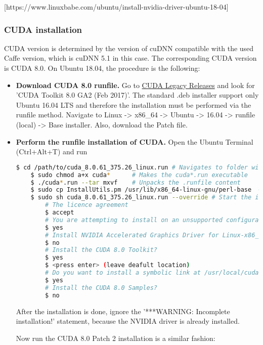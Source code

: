 [https://www.linuxbabe.com/ubuntu/install-nvidia-driver-ubuntu-18-04]

\subsubsection{CUDA installation}

CUDA version is determined by the version of cuDNN compatible with the used Caffe version, which is cuDNN 5.1 in this case. The corresponding CUDA version is CUDA 8.0. On Ubuntu 18.04, the procedure is the following:

\begin{itemize}
	\item \textbf{Download CUDA 8.0 runfile.} Go to \href{https://developer.nvidia.com/cuda-80-ga2-download-archive}{CUDA Legacy Releases} and look for 'CUDA Toolkit 8.0 GA2 (Feb 2017)'. The standard .deb installer support only Ubuntu 16.04 LTS and therefore the installation must be performed via the runfile method. Navigate to Linux -> x86\_64 -> Ubuntu -> 16.04 -> runfile (local) -> Base installer. Also, download the Patch file. 
	
	\item \textbf{Perform the runfile installation of CUDA.} Open the Ubuntu Terminal (Ctrl+Alt+T) and run
	
	\begin{lstlisting}[language=bash]
	$ cd /path/to/cuda_8.0.61_375.26_linux.run # Navigates to folder with CUDA
	$ sudo chmod a+x cuda*		# Makes the cuda*.run executable
	$ ./cuda*.run --tar mxvf 	# Unpacks the .runfile content
	$ sudo cp InstallUtils.pm /usr/lib/x86_64-linux-gnu/perl-base  # Copy one of the extracted files to perl-base
	$ sudo sh cuda_8.0.61_375.26_linux.run --override # Start the installation 
		# The licence agreement
		$ accept 
		# You are attempting to install on an unsupported configuration. Do you wish to continue?
		$ yes 
		# Install NVIDIA Accelerated Graphics Driver for Linux-x86_64 375.26?
		$ no
		# Install the CUDA 8.0 Toolkit?
		$ yes 
		$ <press enter> (leave deafult location)
		# Do you want to install a symbolic link at /usr/local/cuda?
		$ yes
		# Install the CUDA 8.0 Samples?
		$ no
	\end{lstlisting}
	
	After the installation is done, ignore the '***WARNING: Incomplete installation!' statement, because the NVIDIA driver is already installed. 
	
	Now run the CUDA 8.0 Patch 2 installation is a similar fashion:
	

\end{itemize}
